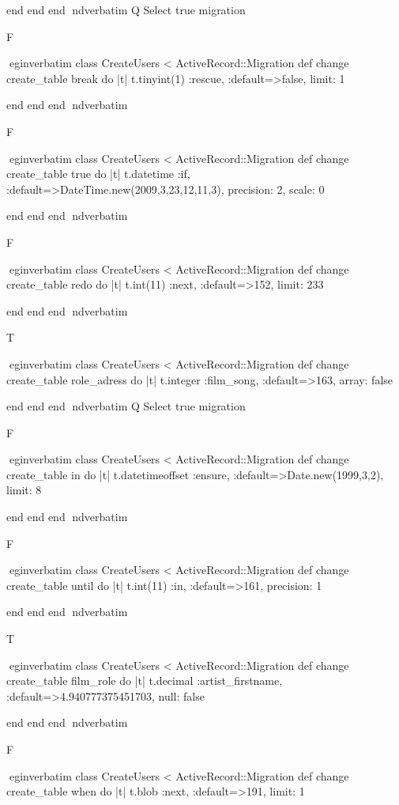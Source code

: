     end 
  end 
end
nd{verbatim}
Q
 Select true migration

F

egin{verbatim}
 class CreateUsers < ActiveRecord::Migration 
  def change 
    create_table break do |t| 
      t.tinyint(1) :rescue, :default=>false, limit: 1
    
    end 
  end 
end
nd{verbatim}

F

egin{verbatim}
 class CreateUsers < ActiveRecord::Migration 
  def change 
    create_table true do |t| 
      t.datetime :if, :default=>DateTime.new(2009,3,23,12,11,3), precision: 2, scale: 0
    
    end 
  end 
end
nd{verbatim}

F

egin{verbatim}
 class CreateUsers < ActiveRecord::Migration 
  def change 
    create_table redo do |t| 
      t.int(11) :next, :default=>152, limit: 233
    
    end 
  end 
end
nd{verbatim}

T

egin{verbatim}
 class CreateUsers < ActiveRecord::Migration 
  def change 
    create_table role_adress do |t| 
      t.integer :film_song, :default=>163, array: false
    
    end 
  end 
end
nd{verbatim}
Q
 Select true migration

F

egin{verbatim}
 class CreateUsers < ActiveRecord::Migration 
  def change 
    create_table in do |t| 
      t.datetimeoffset :ensure, :default=>Date.new(1999,3,2), limit: 8
    
    end 
  end 
end
nd{verbatim}

F

egin{verbatim}
 class CreateUsers < ActiveRecord::Migration 
  def change 
    create_table until do |t| 
      t.int(11) :in, :default=>161, precision: 1
    
    end 
  end 
end
nd{verbatim}

T

egin{verbatim}
 class CreateUsers < ActiveRecord::Migration 
  def change 
    create_table film_role do |t| 
      t.decimal :artist_firstname, :default=>4.940777375451703, null: false
    
    end 
  end 
end
nd{verbatim}

F

egin{verbatim}
 class CreateUsers < ActiveRecord::Migration 
  def change 
    create_table when do |t| 
      t.blob :next, :default=>191, limit: 1
    

